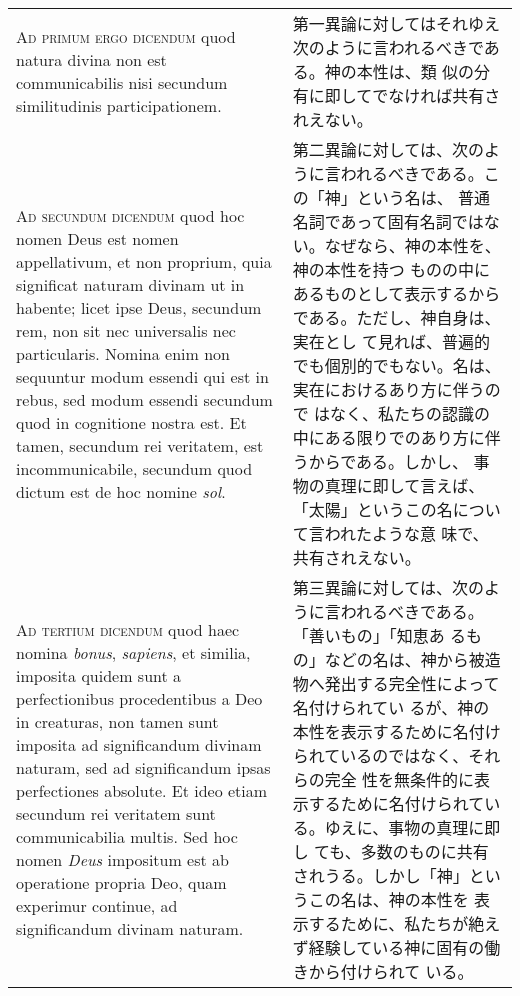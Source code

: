 \documentclass[paper=a4paper,fontsize=10pt,jafontsize=9pt,titlepage]{jlreq}
\begin{document}
\begin{longtable}{p{21em}p{21em}}
\\

{\scshape Ad primum ergo dicendum} quod natura divina non est
communicabilis nisi secundum similitudinis participationem.

&

第一異論に対してはそれゆえ次のように言われるべきである。神の本性は、類
似の分有に即してでなければ共有されえない。
\\

{\scshape Ad secundum dicendum} quod hoc nomen Deus est nomen
appellativum, et non proprium, quia significat naturam divinam ut in
habente; licet ipse Deus, secundum rem, non sit nec universalis nec
particularis. Nomina enim non sequuntur modum essendi qui est in
rebus, sed modum essendi secundum quod in cognitione nostra est. Et
tamen, secundum rei veritatem, est incommunicabile, secundum quod
dictum est de hoc nomine {\itshape sol}.

&

第二異論に対しては、次のように言われるべきである。この「神」という名は、
普通名詞であって固有名詞ではない。なぜなら、神の本性を、神の本性を持つ
ものの中にあるものとして表示するからである。ただし、神自身は、実在とし
て見れば、普遍的でも個別的でもない。名は、実在におけるあり方に伴うので
はなく、私たちの認識の中にある限りでのあり方に伴うからである。しかし、
事物の真理に即して言えば、「太陽」というこの名について言われたような意
味で、共有されえない。

\\

{\scshape Ad tertium dicendum} quod haec nomina {\itshape bonus},
{\itshape sapiens}, et similia, imposita quidem sunt a perfectionibus
procedentibus a Deo in creaturas, non tamen sunt imposita ad
significandum divinam naturam, sed ad significandum ipsas perfectiones
absolute. Et ideo etiam secundum rei veritatem sunt communicabilia
multis. Sed hoc nomen {\itshape Deus} impositum est ab operatione
propria Deo, quam experimur continue, ad significandum divinam
naturam.

&

第三異論に対しては、次のように言われるべきである。「善いもの」「知恵あ
るもの」などの名は、神から被造物へ発出する完全性によって名付けられてい
るが、神の本性を表示するために名付けられているのではなく、それらの完全
性を無条件的に表示するために名付けられている。ゆえに、事物の真理に即し
ても、多数のものに共有されうる。しかし「神」というこの名は、神の本性を
表示するために、私たちが絶えず経験している神に固有の働きから付けられて
いる。

\end{longtable}
\newpage
{}
\end{document}
